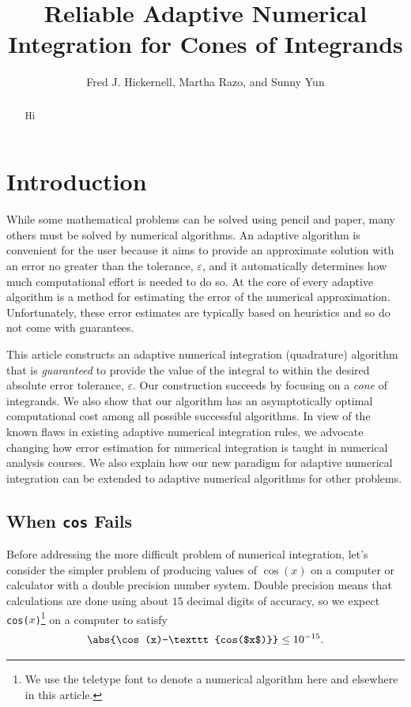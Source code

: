 \documentclass[]{article}
\theoremstyle{definition}
\theoremstyle{remark}
\begin{document}
\title{Reliable Adaptive Numerical Integration for Cones of Integrands}
\author{Fred J. Hickernell, Martha Razo, and Sunny Yun}
\maketitle 


\begin{abstract} Hi
\end{abstract}


\section{Introduction} 

While some mathematical problems can be solved using pencil and paper, many others must be solved by numerical algorithms.  An adaptive algorithm is convenient for the user because it aims to provide an approximate solution with an error no greater than the tolerance, $\varepsilon$, and it automatically determines how much computational effort is needed to do so.  At the core of every adaptive algorithm is a method for estimating the error of the numerical approximation.  Unfortunately, these error estimates are typically based on heuristics and so do not come with guarantees. 

This article constructs an adaptive numerical integration (quadrature) algorithm that is \emph{guaranteed} to provide the value of the integral to within the desired absolute error tolerance, $\varepsilon$.  Our construction succeeds by focusing on a \emph{cone} of integrands.  We also show that our algorithm has an asymptotically optimal computational cost among all possible successful algorithms.  In view of the known flaws in existing adaptive numerical integration rules, we advocate changing how error estimation for numerical integration is taught in numerical analysis courses.  We also explain how our new paradigm for adaptive numerical integration can be extended to adaptive numerical algorithms for other problems.

\subsection{When \texttt{cos} Fails}

Before addressing the more difficult problem of numerical integration, let's consider the simpler problem of producing values of $\cos(x)$ on a computer or calculator with a double precision number system.  Double precision means that calculations are done using about $15$ decimal digits of accuracy, so we expect \texttt{cos($x$)}\footnote{We use the teletype font to denote a numerical algorithm here and elsewhere in this article.} on a computer to satisfy
\begin{equation} \label{coserrexpect}
\abs{\cos(x)-\texttt{cos($x$)}} \le 10^{-15}.
\end{equation}
\end{document}
